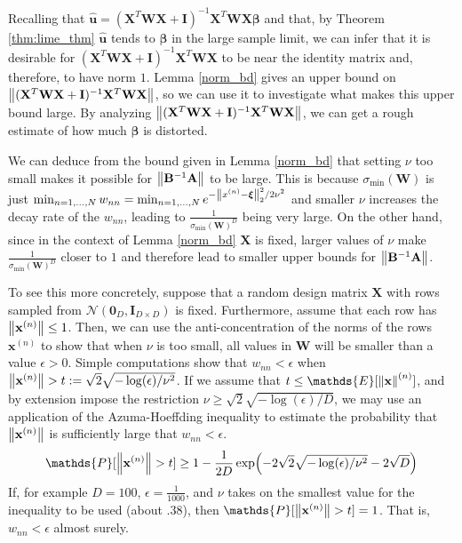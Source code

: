 \documentclass[12pt]{article}  %
\newcommand{\bx}{\mathbf{x}}
\newcommand{\bu}{\mathbf{u}}
\newcommand{\bA}{\mathbf{A}}
\newcommand{\bB}{\mathbf{B}}
\newcommand{\bX}{\mathbf{X}}
\newcommand{\bI}{\mathbf{I}}
\newcommand{\bW}{\mathbf{W}}
\newcommand{\bxi}{\boldsymbol{\xi}}
\begin{document}
                Recalling that $\hat{\bu}=(\bX^T \bW \bX+\bI)^{-1}\bX^T \bW \bX \boldsymbol{\beta}$ and that, by Theorem \ref{thm:lime_thm} $\hat{\bu}$ tends to $\boldsymbol{\beta}$ in the large sample limit, we can infer that it is desirable for $(\bX^T \bW \bX+\bI)^{-1}\bX^T \bW \bX$ to be near the identity matrix and, therefore, to have norm $1$. Lemma \ref{norm_bd} gives an upper bound on $\norm{(\bX^T \bW \bX+\bI)^{-1}\bX^T \bW \bX}$, so we can use it to investigate what makes this upper bound large. By analyzing $\norm{(\bX^T \bW \bX+\bI)^{-1}\bX^T \bW \bX}$, we can get a rough estimate of how much $\boldsymbol{\beta}$ is distorted. %
                
                We can deduce from the bound given in Lemma \ref{norm_bd} that setting $\nu$ too small makes it possible for $\norm{\bB^{-1}\bA}$ to be large. This is because $\sigma_{\min}(\bW)$ is just $\min_{n=1,\ldots,N} w_{nn}=\min_{n=1,\ldots,N} e^{-\norm{x^{(n)}-\bxi}_2^2/2\nu^2}$ and smaller $\nu$ increases the decay rate of the $w_{nn}$, leading to $\frac{1}{\sigma_{\min}(\bW)^D}$ being very large. On the other hand, since in the context of Lemma \ref{norm_bd} $\bX$ is fixed, larger values of $\nu$ make $\frac{1}{\sigma_{\min}(\bW)^D}$ closer to $1$ and therefore lead to smaller upper bounds for $\norm{\bB^{-1}\bA}$.

                To see this more concretely, suppose that a random design matrix $\bX$ with rows sampled from $\mathcal{N}(\mathbf{0}_{D}, \bI_{D\times D})$ is fixed. Furthermore, assume that each row has $\norm{\bx^{(n)}} \leq 1$. Then, we can use the anti-concentration of the norms of the rows $\bx^{(n)}$ to show that when $\nu$ is too small, all values in $\bW$ will be smaller than a value $\epsilon > 0$. Simple computations show that $w_{nn} < \epsilon$ when $\norm{\bx^{(n)}} > t:= \sqrt{2}\sqrt{-\log(\epsilon)/\nu^2}$. If we assume that $t\leq \mathds{E}[\norm{\bx}^{(n)}]$, and by extension impose the restriction $\nu \geq \sqrt{2}\sqrt{-\log(\epsilon)/D}$, we may use an application of the Azuma-Hoeffding inequality \citep{hoeffding1994probability} to estimate the probability that $\norm{\bx^{(n)}}$ is sufficiently large that $w_{nn} < \epsilon$. 
                \begin{equation*}
                    \mathds{P}[\norm{\bx^{(n)}} > t] \geq 1 - \frac{1}{2D}\exp(-2\sqrt{2}\sqrt{-\log(\epsilon)/\nu^2}-2\sqrt{D})
                \end{equation*}
                If, for example $D=100$, $\epsilon=\frac{1}{1000}$, and $\nu$ takes on the smallest value for the inequality to be used (about $.38$), then $\mathds{P}[\norm{\bx^{(n)}} > t]=1$. That is, $w_{nn}<\epsilon$  almost surely.
\end{document}
